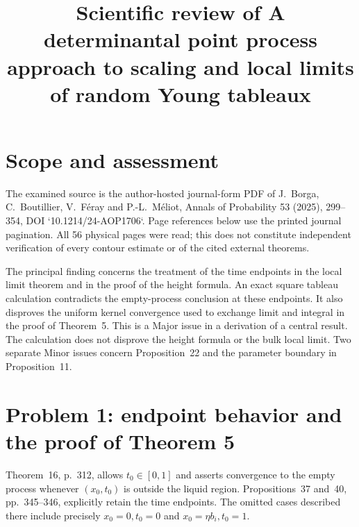 \documentclass[10pt]{article}
\title{Scientific review of
A determinantal point process approach to scaling and local limits of random Young tableaux}
\author{}
\date{}
\begin{document}
\maketitle
\section*{Scope and assessment}
The examined source is the author-hosted journal-form PDF of J. Borga, C. Boutillier, V. Féray and P.-L. Méliot, Annals of Probability 53 (2025), 299–354, DOI `10.1214/24-AOP1706`. Page references below use the printed journal pagination. All 56 physical pages were read; this does not constitute independent verification of every contour estimate or of the cited external theorems.\par
The principal finding concerns the treatment of the time endpoints in the local limit theorem and in the proof of the height formula. An exact square tableau calculation contradicts the empty-process conclusion at these endpoints. It also disproves the uniform kernel convergence used to exchange limit and integral in the proof of Theorem 5. This is a Major issue in a derivation of a central result. The calculation does not disprove the height formula or the bulk local limit. Two separate Minor issues concern Proposition 22 and the parameter boundary in Proposition 11.\par
\section*{Problem 1: endpoint behavior and the proof of Theorem 5}
Theorem 16, p. 312, allows \(t_0\in[0,1]\) and asserts convergence to the empty process whenever \((x_0,t_0)\) is outside the liquid region. Propositions 37 and 40, pp. 345–346, explicitly retain the time endpoints. The omitted cases described there include precisely \(x_0=0,t_0=0\) and \(x_0=\eta b_i,t_0=1\).\par
\end{document}
